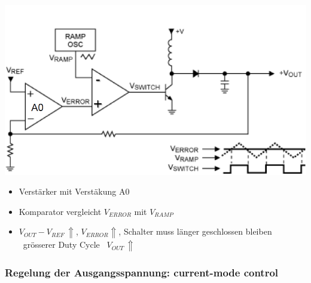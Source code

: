\begin{minipage}{0.42\columnwidth}
    \includegraphics[width=\columnwidth]{images/regelung_ausgangsspannung_voltage.png}
\end{minipage}
\hfill
\begin{minipage}{0.56\columnwidth}
    \begin{itemize}
        \item Verstärker mit Verstäkung A0
        \item Komparator vergleicht $V_{ERROR}$ mit $V_{RAMP}$
        \item $V_{OUT} - V_{REF} \, \Uparrow$,  $V_{ERROR} \Uparrow$, Schalter muss 
            länger geschlossen bleiben \textrightarrow\ grösserer Duty Cycle \textrightarrow\ $V_{OUT} \, \Uparrow$
    \end{itemize}
\end{minipage}


\subsubsection{Regelung der Ausgangsspannung: current-mode control}


